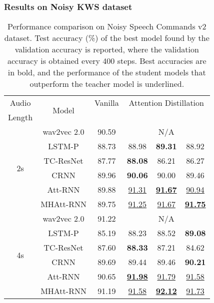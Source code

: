 \documentclass{article}
\begin{document}
\subsubsection{Results on Noisy KWS dataset}\label{subsubsec:3_2_2_synthetic_dataset}
\begin{table}[t]
\caption{
Performance comparison on Noisy Speech Commands v2 dataset.
Test accuracy (\%) of the best model found by the validation accuracy is reported, where the validation accuracy is obtained every 400 steps.
Best accuracies are in bold, and the performance of the student models that outperform the teacher model is underlined.
}
\vspace*{0.3cm}
\label{tab:2_evaluation_results_noisy}

\scriptsize
\centering


\begin{tabular}{c|c|c|ccc}

\toprule

Audio & \multirow{2}{*}{Model} & Vanilla & \multicolumn{3}{c}{Attention Distillation} \\
Length &  &  &  &  &  \\
\midrule

\multirow{6}{*}{ 2s } & wav2vec 2.0 & 90.59 & \multicolumn{3}{c}{ N/A } \\
\cmidrule{2-6}
& LSTM-P & 88.73 & 88.98 & \textbf{ 89.31 } & 88.92 \\
& TC-ResNet & 87.77 & \textbf{ 88.08 } & 86.21 & 86.27 \\
& CRNN & 89.96 & \textbf{ 90.06 } & 90.00 & 89.46 \\
& Att-RNN & 89.88 & \underline{91.31} & \textbf{ \underline{91.67} } & \underline{90.94} \\
& MHAtt-RNN & 89.75 & \underline{91.25} & \underline{91.67} & \textbf{ \underline{91.75} } \\
\midrule

\multirow{6}{*}{ 4s } & wav2vec 2.0 & 91.22 & \multicolumn{3}{c}{ N/A } \\
\cmidrule{2-6}
& LSTM-P & 85.19 & 88.23 & 88.52 & \textbf{ 89.08 } \\
& TC-ResNet & 87.60 & \textbf{ 88.33 } & 87.21 & 84.62 \\
& CRNN & 89.69 & 89.44 & 89.46 & \textbf{ 90.21 } \\
& Att-RNN & 90.65 & \textbf{ \underline{91.98} } & \underline{91.79} & \underline{91.58} \\
& MHAtt-RNN & 91.19 & \underline{91.58} & \textbf{ \underline{92.12} } & \underline{91.73} \\
\midrule


\end{tabular}
\end{table}
\end{document}
